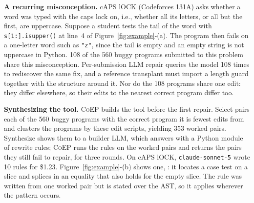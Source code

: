 \documentclass[acmsmall,screen,review,anonymous,nonacm]{acmart}
\newcommand{\tool}{\textsc{CoEP}\xspace}
\newcommand{\cs}{\texttt{claude-sonnet-5}\xspace}
\begin{document}
\textbf{A recurring misconception.} cAPS lOCK (Codeforces 131A) asks whether a word was typed with the caps lock on, i.e., whether all its letters, or all but the first, are uppercase. Suppose a student tests the tail of the word with \texttt{s[1:].isupper()} at line~4 of Figure~\ref{fig:example}-(a). The program then fails on a one-letter word such as \texttt{"z"}, since the tail is empty and an empty string is not uppercase in Python. 108 of the 560 buggy programs submitted to this problem share this misconception. Per-submission LLM repair queries the model 108 times to rediscover the same fix, and a reference transplant must import a length guard together with the structure around it. Nor do the 108 programs share one edit: they differ elsewhere, so their edits to the nearest correct program differ too.

\textbf{Synthesizing the tool.} \tool builds the tool before the first repair. Select pairs each of the 560 buggy programs with the correct program it is fewest edits from and clusters the programs by these edit scripts, yielding 353 worked pairs. Synthesize shows them to a builder LLM, which answers with a Python module of rewrite rules; \tool runs the rules on the worked pairs and returns the pairs they still fail to repair, for three rounds. On cAPS lOCK, \cs wrote 10 rules for \$1.23. Figure~\ref{fig:example}-(b) shows one, : it locates a case test on a slice and splices in an equality that also holds for the empty slice. The rule was written from one worked pair but is stated over the AST, so it applies wherever the pattern occurs.
\end{document}
